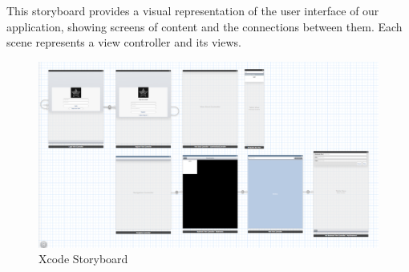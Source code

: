 \documentclass[a4wide, 10pt]{article}
\begin{document}
This storyboard provides a visual representation of the user interface of our application, showing screens of content and the connections between them. Each scene represents a view controller and its views.

\begin{figure}
	\centering	
	\includegraphics[width=\textwidth]{screenshots/Storyboard}
	\caption{Xcode Storyboard}
\end{figure}
\end{document}

